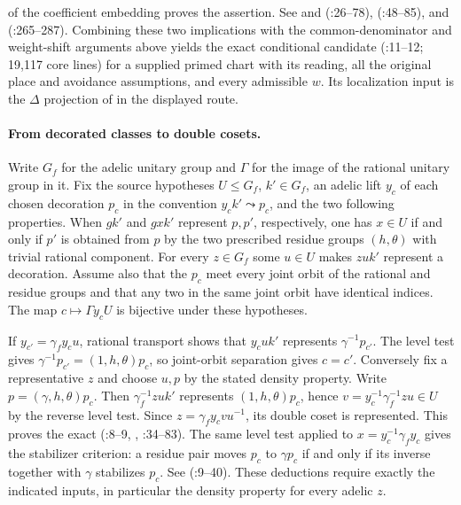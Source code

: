 of the coefficient embedding proves the assertion.
See  and 
(:26--78),
 (:48--85),
 and 
(:265--287).
Combining these two implications with the common-denominator and
weight-shift arguments above yields the exact conditional candidate
(:11--12;
19,117 core lines) for a supplied primed chart with its reading, all
the original place and avoidance assumptions, and every admissible $w$.
Its localization input is the $\Delta$ projection of
 in the displayed route.

\paragraph{From decorated classes to double cosets.}\label{r13:s9-cosets}
Write $G_f$ for the adelic unitary group and $\Gamma$ for the image of the
rational unitary group in it. Fix the source hypotheses $U\le G_f$,
$k'\in G_f$, an adelic lift $y_c$ of each chosen decoration $p_c$
in the convention $y_ck'\leadsto p_c$, and the two following properties.
When $gk'$ and $gxk'$ represent $p,p'$, respectively, one has
$x\in U$ if and only if $p'$ is obtained from $p$ by the two prescribed
residue groups $(h,\theta)$ with trivial rational component.
For every $z\in G_f$ some $u\in U$ makes $zuk'$ represent a decoration.
Assume also that the $p_c$ meet every joint orbit of the rational and
residue groups and that any two in the same joint orbit have identical
indices. The map $c\mapsto\Gamma y_c U$ is bijective under these
hypotheses.

If $y_{c'}=\gamma_f y_c u$, rational transport shows that
$y_cuk'$ represents $\gamma^{-1}p_{c'}$. The level test gives
$\gamma^{-1}p_{c'}=(1,h,\theta)p_c$, so joint-orbit separation gives
$c=c'$. Conversely fix a representative $z$ and choose $u,p$ by
the stated density property. Write $p=(\gamma,h,\theta)p_c$.
Then $\gamma_f^{-1}zuk'$ represents $(1,h,\theta)p_c$, hence
$v=y_c^{-1}\gamma_f^{-1}zu\in U$ by the reverse level test.
Since $z=\gamma_f y_c vu^{-1}$, its double coset is represented.
This proves the exact 
(:8--9,
, :34--83).
The same level test applied to $x=y_c^{-1}\gamma_f y_c$ gives the
stabilizer criterion: a residue pair moves $p_c$ to $\gamma p_c$
if and only if its inverse together with $\gamma$ stabilizes $p_c$.
See  (:9--40).
These deductions require exactly the indicated inputs, in particular
the density property for every adelic $z$.

